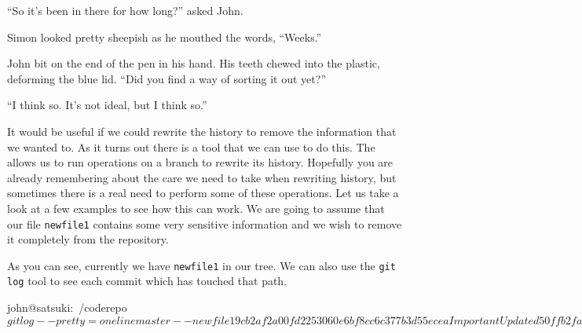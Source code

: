 \begin{trenches}
``So it's been in there for how long?'' asked John.

Simon looked pretty sheepish as he mouthed the words, ``Weeks.''

John bit on the end of the pen in his hand.
His teeth chewed into the plastic, deforming the blue lid.
``Did you find a way of sorting it out yet?''

``I think so. It's not ideal, but I think so.''
\end{trenches}

It would be useful if we could rewrite the history to remove the information that we wanted to.
As it turns out there is a tool that we can use to do this.
The  allows us to run operations on a branch to rewrite its history.
Hopefully you are already remembering about the care we need to take when rewriting history, but sometimes there is a real need to perform some of these operations.
Let us take a look at a few examples to see how this can work.
We are going to assume that our file \texttt{newfile1} contains some very sensitive information and we wish to remove it completely from the repository.


As you can see, currently we have \texttt{newfile1} in our tree.
We can also use the \texttt{git log} tool to see each commit which has touched that path.

\begin{code}
john@satsuki:~/coderepo$ git log --pretty=oneline master -- newfile1
9cb2af2a00fd2253060e6bf8cc6c377b3d55ecea Important Update
d50ffb2fa536d869f2c4e89e8d6a48e0a29c5cc1 Merged in zaney
a27d49ef11d9f0e66edbad8f6c7806510ad5b2be Made an awesome change
cfbecabb031696a217b77b0e1285f2d5fc2ea2a3 Fantastic new feature
55fb69f4ad26fdb6b90ac6f43431be40779962dd Added two new files
john@satsuki:~/coderepo$
\end{code}

